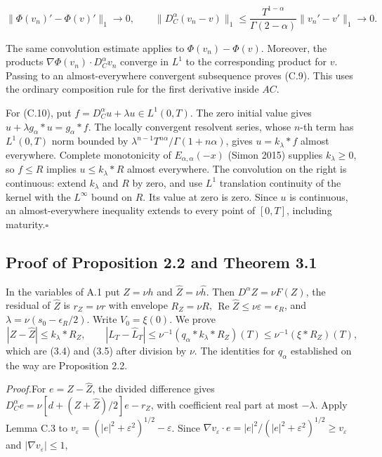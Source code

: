\documentclass[11pt,a4paper]{article}
\newcommand{\proofhead}[1]{\par\addvspace{0.3\baselineskip}\noindent\textit{#1.}\enspace}
\newcommand{\proofend}{\hfill\(\square\)\par\addvspace{0.6\baselineskip}}
\begin{document}
\begin{equation*}\tag{C.12}
\|\Phi(v_n)' - \Phi(v)'\|_1\to0,
\qquad
\|D_C^\alpha(v_n-v)\|_1
\le\frac{T^{1-\alpha}}{\Gamma(2-\alpha)}\|v_n'-v'\|_1\to0.
\end{equation*}

The same convolution estimate applies to \(\Phi(v_n)-\Phi(v)\). Moreover, the products \(\nabla\Phi(v_n)\cdot D_C^\alpha v_n\) converge in \(L^1\) to the corresponding product for \(v\). Passing to an almost-everywhere convergent subsequence proves (C.9). This uses the ordinary composition rule for the first derivative inside \(AC\).

For (C.10), put \(f=D_C^\alpha u+\lambda u\in L^1(0,T)\). The zero initial value gives \(u+\lambda g_\alpha*u=g_\alpha*f\). The locally convergent resolvent series, whose \(n\)-th term has \(L^1(0,T)\) norm bounded by \(\lambda^{n-1}T^{n\alpha}/\Gamma(1+n\alpha)\), gives \(u=k_\lambda*f\) almost everywhere. Complete monotonicity of \(E_{\alpha,\alpha}(-x)\) (Simon 2015) supplies \(k_\lambda\ge0\), so \(f\le R\) implies \(u\le k_\lambda*R\) almost everywhere. The convolution on the right is continuous: extend \(k_\lambda\) and \(R\) by zero, and use \(L^1\) translation continuity of the kernel with the \(L^\infty\) bound on \(R\). Its value at zero is zero. Since \(u\) is continuous, an almost-everywhere inequality extends to every point of \([0,T]\), including maturity.\proofend

\setcounter{subsection}{1}\subsection{Proof of Proposition 2.2 and Theorem 3.1}

In the variables of A.1 put \(Z=\nu h\) and \(\widehat Z=\nu\widehat h\). Then \(D^\alpha Z=\nu F(Z)\), the residual of \(\widehat Z\) is \(r_Z=\nu r\) with envelope \(R_Z=\nu R\), \(\operatorname{Re}\widehat Z\le\nu\varepsilon=\epsilon_R\), and \(\lambda=\nu(s_0-\epsilon_R/2)\). Write \(V_0=\xi(0)\). We prove
\[
|Z-\widehat Z|\le k_\lambda*R_Z,\qquad
|L_T-\widehat L_T|\le\nu^{-1}(q_\alpha*k_\lambda*R_Z)(T)\le\nu^{-1}(\xi*R_Z)(T),
\]
which are (3.4) and (3.5) after division by \(\nu\). The identities for \(q_\alpha\) established on the way are Proposition 2.2.

\proofhead{Proof}For \(e=Z-\widehat Z\), the divided difference gives \(D_C^\alpha e=\nu[d+(Z+\widehat Z)/2]e-r_Z\), with coefficient real part at most \(-\lambda\). Apply Lemma C.3 to \(v_\varepsilon=(|e|^2+\varepsilon^2)^{1/2}-\varepsilon\). Since \(\nabla v_\varepsilon\cdot e=|e|^2/(|e|^2+\varepsilon^2)^{1/2}\ge v_\varepsilon\) and \(|\nabla v_\varepsilon|\le1\),
\end{document}
